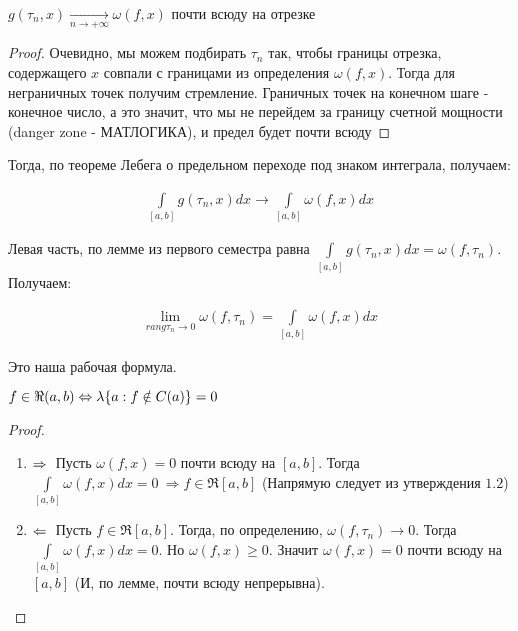 \begin{statement}
$g(\tau_n, x) \xrightarrow[n \rightarrow +\infty]{} \omega(f, x)$ почти всюду на отрезке
\end{statement}

\begin{proof}
    Очевидно, мы можем подбирать $\tau_n$ так, чтобы границы отрезка, содержащего $x$ 
    совпали с границами из определения $\omega(f,x)$. Тогда для неграничных точек получим стремление. 
    Граничных точек на конечном шаге - конечное число, а это значит, что мы не перейдем за границу счетной 
    мощности (danger zone - МАТЛОГИКА), и предел будет почти всюду 
\end{proof}

Тогда, по теореме Лебега о предельном переходе под знаком интеграла, получаем:

\begin{gather*}
    \int\limits_{[a, b]}g(\tau_n, x)dx \rightarrow \int\limits_{[a,b]}\omega(f,x)dx
\end{gather*}

Левая часть, по лемме из первого семестра равна $\int\limits_{[a, b]}g(\tau_n, x)dx = \omega(f, \tau_n)$.
Получаем:

\begin{gather*}
    \lim\limits_{rang\tau_n \rightarrow 0} \omega(f, \tau_n) = \int\limits_{[a,b]} \omega(f,x)dx
\end{gather*}

Это наша рабочая формула.

\begin{theorem}
    $\\ f \in \Re (a, b) \Leftrightarrow \lambda\{ a : f \notin C(a) \} = 0$
\end{theorem}

\begin{proof}
	\begin{enumerate}
		\item 
			$\Rightarrow \\$ Пусть $\omega(f,x) = 0$ почти всюду на $[a, b]$. Тогда $\int\limits_{[a,b]} \omega(f, x)dx = 0 \: \Rightarrow f \in \Re [a,b]$ (Напрямую следует из утверждения $1.2$) 
		\item 
			$\Leftarrow \\$ Пусть $f \in \Re [a, b]$. Тогда, по определению, $\omega(f, \tau_n) \rightarrow 0$. 
            Тогда $\int\limits_{[a,b]} \omega(f, x)dx = 0$. Но $\omega(f, x) \geqslant 0$. 
            Значит $\omega(f,x) = 0$ почти всюду на $[a,b]$ (И, по лемме, почти всюду непрерывна).
	\end{enumerate}
\end{proof}


